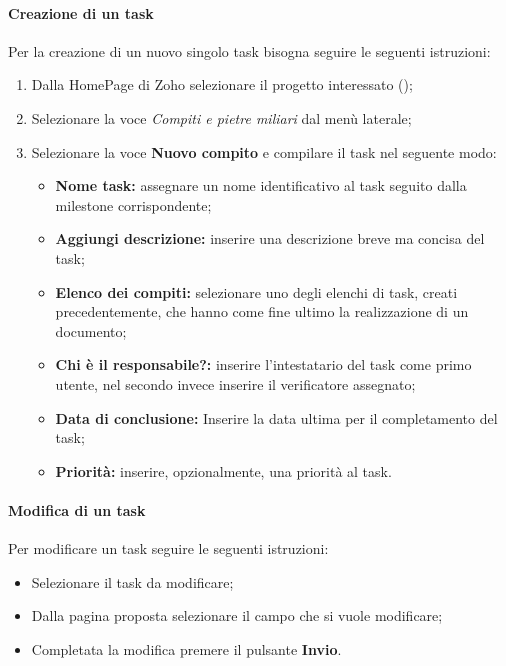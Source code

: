 \paragraph{Creazione di un task}
Per la creazione di un nuovo singolo task bisogna seguire le seguenti 
istruzioni:
\begin{enumerate}
  \item Dalla HomePage di Zoho selezionare il progetto interessato (\progetto);
  \item Selezionare la voce \textsl{Compiti e pietre miliari} dal menù laterale;
  \item Selezionare la voce \textbf{Nuovo compito} e compilare il task nel 
  seguente modo:
    \begin{itemize}
      \item \textbf{Nome task:} assegnare un nome identificativo al task seguito dalla milestone corrispondente;
      \item \textbf{Aggiungi descrizione:} inserire una descrizione breve ma 
      concisa del task;
      \item \textbf{Elenco dei compiti:} selezionare uno degli elenchi di 
      task, creati precedentemente, che hanno come fine ultimo la realizzazione di un 
      documento;
      \item \textbf{Chi è il responsabile?:} inserire l'intestatario del task 
      come primo utente, nel secondo invece inserire il verificatore assegnato;
      \item \textbf{Data di conclusione:} Inserire la data ultima per il 
      completamento del task;
     \item \textbf{Priorità:} inserire, opzionalmente, una priorità al task.
    \end{itemize}
\end{enumerate}


\paragraph{Modifica di un task}
Per modificare un task seguire le seguenti istruzioni:
\begin{itemize}
  \item Selezionare il task da modificare;
  \item Dalla pagina proposta selezionare il campo che si vuole modificare;
  \item Completata la modifica premere il pulsante \textbf{Invio}.
\end{itemize}

